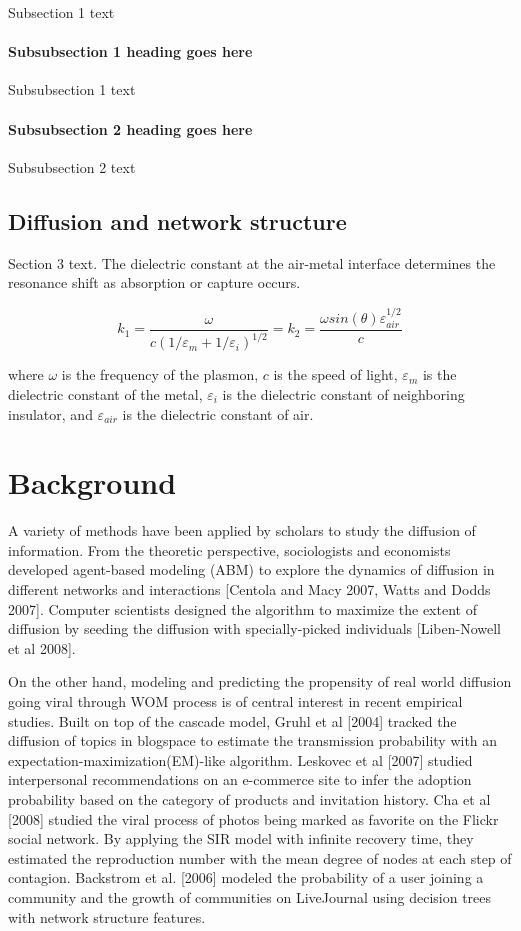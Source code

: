 \documentclass[phd,tocprelim]{cornell}
\begin{document}
Subsection 1 text

\subsubsection{Subsubsection 1 heading goes here}
Subsubsection 1 text

\subsubsection{Subsubsection 2 heading goes here}
Subsubsection 2 text

\section{Diffusion and network structure}
Section 3 text. The dielectric constant at the air-metal interface
determines the resonance shift as absorption or capture occurs.

\begin{equation}
k_1=\frac{\omega }{c({1/\varepsilon_m + 1/\varepsilon_i})^{1/2}}=k_2=\frac{\omega
sin(\theta)\varepsilon_{air}^{1/2}}{c}
\end{equation}

\noindent
where $\omega$ is the frequency of the plasmon, $c$ is the speed of
light, $\varepsilon_m$ is the dielectric constant of the metal,
$\varepsilon_i$ is the dielectric constant of neighboring insulator,
and $\varepsilon_{air}$ is the dielectric constant of air.

\chapter{Background}
A variety of methods have been applied by scholars to study the diffusion of information. From the theoretic perspective, sociologists and economists developed agent-based modeling (ABM) to explore the dynamics of diffusion in different networks and interactions [Centola and Macy 2007, Watts and Dodds 2007]. Computer scientists designed the algorithm to maximize the extent of diffusion by seeding the diffusion with specially-picked individuals [Liben-Nowell et al 2008]. 

On the other hand, modeling and predicting the propensity of real world diffusion going viral through WOM process is of central interest in recent empirical studies. Built on top of the cascade model, Gruhl et al [2004] tracked the diffusion of topics in blogspace to estimate the transmission probability with an expectation-maximization(EM)-like algorithm. Leskovec et al [2007] studied interpersonal recommendations on an e-commerce site to infer the adoption probability based on the category of products and invitation history. Cha et al [2008] studied the viral process of photos being marked as favorite on the Flickr social network. By applying the SIR model with infinite recovery time, they estimated the reproduction number with the mean degree of nodes at each step of contagion. Backstrom et al. [2006] modeled the probability of a user  joining a community and the growth of communities on LiveJournal using decision trees with network structure features.
\end{document}

